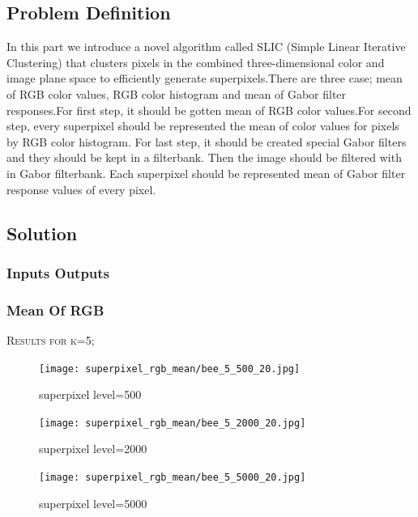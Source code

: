 \documentclass[12pt]{article}
\begin{document}
\subsection{Problem Definition}
In this part we introduce a novel algorithm called SLIC (Simple Linear Iterative Clustering) that clusters pixels in the combined three-dimensional color and image plane space to efficiently generate superpixels.There are three case; mean of RGB color values, RGB color histogram and mean of Gabor filter responses.For first step, it should be gotten mean of RGB color values.For second step, every superpixel should be represented the mean of color values for pixels by RGB color histogram. For last step, it should be created special Gabor filters and they should be kept in a filterbank. Then the image should be filtered with in Gabor filterbank. Each superpixel should be represented mean of Gabor filter response values of every pixel.

\subsection{Solution}

\subsubsection{Inputs Outputs}

\subsubsection*{Mean Of RGB}
\begin{minipage}{\linewidth}
\centering
	\textsc{\large Results for k=5;}\\[0.1 cm]  
	\begin{minipage}{0.45\linewidth}
		\begin{figure} [H]
			\centering
			 \texttt{[image: superpixel\_rgb\_mean/bee\_5\_500\_20.jpg]}
	 		\caption{superpixel level=500}
		\end{figure}
	\end{minipage}
	\hspace{0.05\linewidth}
	\begin{minipage}{0.45\linewidth}
			\begin{figure} [H]
				\centering
				 \texttt{[image: superpixel\_rgb\_mean/bee\_5\_2000\_20.jpg]}
	 			\caption{superpixel level=2000}
			\end{figure}
	\end{minipage}
	\hspace{0.05\linewidth}
	\begin{minipage}{0.45\linewidth}
		\begin{figure} [H]
			\centering
			 \texttt{[image: superpixel\_rgb\_mean/bee\_5\_5000\_20.jpg]}
	 		\caption{superpixel level=5000}
		\end{figure}
	\end{minipage}
\end{minipage}
\end{document}
